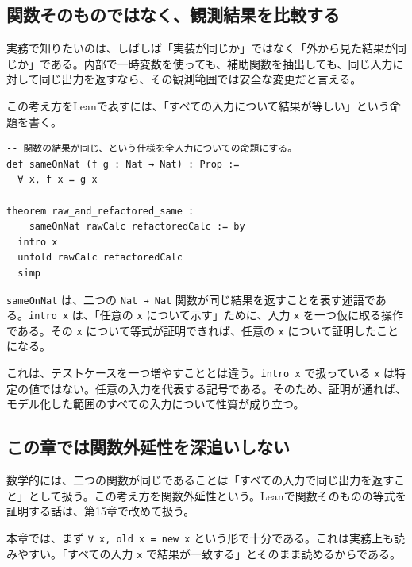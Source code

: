 \subsection{関数そのものではなく、観測結果を比較する}

実務で知りたいのは、しばしば「実装が同じか」ではなく「外から見た結果が同じか」である。内部で一時変数を使っても、補助関数を抽出しても、同じ入力に対して同じ出力を返すなら、その観測範囲では安全な変更だと言える。

この考え方をLeanで表すには、「すべての入力について結果が等しい」という命題を書く。

\begin{listing}[htbp]
\begin{verbatim}
-- 関数の結果が同じ、という仕様を全入力についての命題にする。
def sameOnNat (f g : Nat → Nat) : Prop :=
  ∀ x, f x = g x

theorem raw_and_refactored_same :
    sameOnNat rawCalc refactoredCalc := by
  intro x
  unfold rawCalc refactoredCalc
  simp
\end{verbatim}
\caption{すべての入力で同じ結果を返すという仕様}
\label{lst:ch03_same_on_nat}
\end{listing}

\texttt{sameOnNat} は、二つの \texttt{Nat → Nat} 関数が同じ結果を返すことを表す述語である。\texttt{intro x} は、「任意の \texttt{x} について示す」ために、入力 \texttt{x} を一つ仮に取る操作である。その \texttt{x} について等式が証明できれば、任意の \texttt{x} について証明したことになる。

\begin{softwarebox}
これは、テストケースを一つ増やすこととは違う。\texttt{intro x} で扱っている \texttt{x} は特定の値ではない。任意の入力を代表する記号である。そのため、証明が通れば、モデル化した範囲のすべての入力について性質が成り立つ。
\end{softwarebox}

\subsection{この章では関数外延性を深追いしない}

数学的には、二つの関数が同じであることは「すべての入力で同じ出力を返すこと」として扱う。この考え方を関数外延性という。Leanで関数そのものの等式を証明する話は、第15章で改めて扱う。

本章では、まず \texttt{∀ x, old x = new x} という形で十分である。これは実務上も読みやすい。「すべての入力 \texttt{x} で結果が一致する」とそのまま読めるからである。

